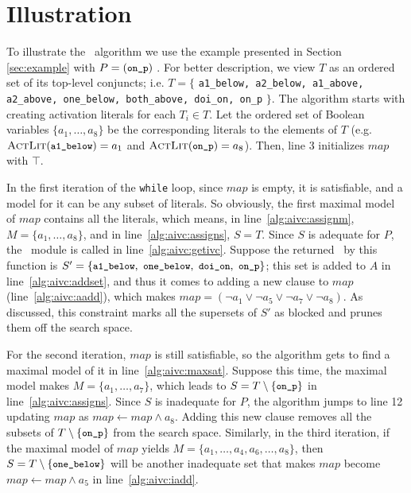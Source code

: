 \section{Illustration}
\label{sec:illust}
To illustrate the \aivcalg ~algorithm we use the example presented in Section \ref{sec:example} with $P = (\small{\texttt{on\_p}})$ .
For better description, we view $T$ as an ordered set of its top-level conjuncts; i.e. $T = \{$ {\small \texttt{a1\_below, a2\_below, a1\_above, a2\_above, one\_below, both\_above, doi\_on, on\_p}} $\}$.
The algorithm starts with creating activation literals for each $T_i \in T$. Let the ordered set of Boolean variables $\{ a_1, \ldots , a_8 \}$ be the corresponding literals to the elements of $T$ (e.g. $\actlit (\small{\texttt{a1\_below}}) = a_1$ and $\actlit (\small{\texttt{on\_p}}) = a_8$). Then, line 3 initializes $map$ with $\top$.

In the first iteration of the \texttt{while} loop, since $map$ is
empty, it is satisfiable, and a model for it can be any subset of
literals. So obviously, the first maximal model of $map$ contains all
the literals, which means, in line~\ref{alg:aivc:assignm}, $M = \{a_1,
\ldots, a_8\}$, and in line~\ref{alg:aivc:assigns}, $S = T$. Since $S$
is adequate for $P$, the \getivc ~module is called in
line~\ref{alg:aivc:getivc}. Suppose the returned \mivc\ by this function
is $S' = \{ \small{ \texttt{a1\_below},~\texttt{one\_below},
  ~\texttt{doi\_on},~\texttt{on\_p}}\}$; this set is added to $A$ in
line~\ref{alg:aivc:addset}, and thus it comes to adding a new clause
to $map$ (line~\ref{alg:aivc:aadd}), which makes $map = (\neg a_1 \vee
\neg a_5 \vee \neg a_7 \vee \neg a_8)$. As discussed, this constraint
marks all the supersets of $S'$ as blocked and prunes them off the
search space.

For the second iteration, $map$ is still satisfiable,
so the algorithm gets to find a maximal model of it in line~\ref{alg:aivc:maxsat}. Suppose this time, the maximal model makes $M = \{a_1, \ldots, a_7\}$,
which leads to $S = T \setminus \{\small{\texttt{on\_p}}\} $ in line~\ref{alg:aivc:assigns}.
Since $S$ is inadequate for $P$, 
the algorithm jumps to line 12 updating 
$map$ as $map \leftarrow map \wedge a_8$. 
Adding this new clause removes all the subsets of 
$T \setminus \{\small{\texttt{on\_p}}\}$ 
from the search space. Similarly, in the third iteration, if the maximal model of $map$
yields $M = \{a_1, \ldots, a_4, a_6, \ldots, a_8\}$, then $S = T \setminus \{\small{\texttt{one\_below}}\} $ will be another inadequate set that makes $map$ become 
$map \leftarrow map \wedge a_5$
in line~\ref{alg:aivc:iadd}.

